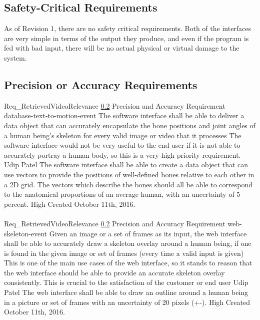 \documentclass{scrreprt}
\begin{document}
\subsection{Safety-Critical Requirements}
\label{req-safety-critical}
As of Revision 1, there are no safety critical requirements. Both of the interfaces are very simple in terms of the output they produce, and even if the program is fed with bad input, there will be no actual physical or virtual damage to the system.

\subsection{Precision or Accuracy Requirements}
\label{req-precision-accuracy}
\requirement
{Req_RetrievedVideoRelevance}
{\ref{req-precision-accuracy} Precision and Accuracy Requirement}
{database-text-to-motion-event}
{The software interface shall be able to deliver a data object that can accurately encapsulate the bone positions and joint angles of a human being's skeleton for every valid image or video that it processes}
{The software interface would not be very useful to the end user if it is not able to accurately portray a human body, so this is a very high priority requirement.}
{Udip Patel}
{The software interface shall be able to create a data object that can use vectors to provide the positions of well-defined bones relative to each other in a 2D grid. The vectors which describe the bones should all be able to correspond to the anatomical proportions of an average human, with an uncertainty of 5 percent.}
{High}
{Created October 11th, 2016.}
\\ \\

\requirement
{Req_RetrievedVideoRelevance}
{\ref{req-precision-accuracy} Precision and Accuracy Requirement}
{web-skeleton-event}
{Given an image or a set of frames as its input, the web interface shall be able to accurately draw a skeleton overlay around a human being, if one is found in the given image or set of frames (every time a valid input is given)}
{This is one of the main use cases of the web interface, so it stands to reason that the web interface should be able to provide an accurate skeleton overlay consistently. This is crucial to the satisfaction of the customer or end user }
{Udip Patel}
{The web interface shall be able to draw an outline around a human being in a picture or set of frames with an uncertainty of 20 pixels (+-).}
{High}
{Created October 11th, 2016.}
\end{document}
